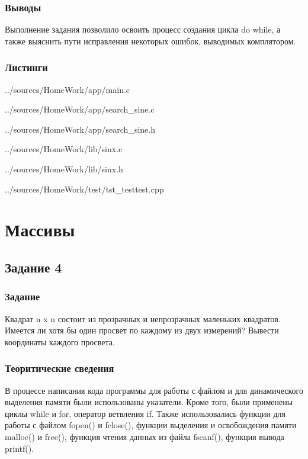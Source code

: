 \documentclass[12pt,a4paper]{report}
\begin{document}
\subsection{Выводы}
Выполнение задания позволило освоить процесс создания цикла do while, а также выяснить пути исправления некоторых ошибок, выводимых комплятором.

\subsection*{Листинги}

{../sources/HomeWork/app/main.c}


{../sources/HomeWork/app/search_sine.c}


{../sources/HomeWork/app/search_sine.h}


{../sources/HomeWork/lib/sinx.c}


{../sources/HomeWork/lib/sinx.h}


{../sources/HomeWork/test/tst_testtest.cpp}




\chapter{Массивы}
\section{Задание 4}
\subsection{Задание}
Квадрат n x n состоит из прозрачных и непрозрачных маленьких квадратов. Имеется ли хотя бы один просвет по каждому из двух измерений? Вывести координаты каждого просвета.

\subsection{Теоритические сведения}

В процессе написания кода программы для работы с файлом и для динамического выделения памяти были использованы указатели. Кроме того, были применены циклы while и for, оператор ветвления if. Также использовались функции для работы с файлом fopen() и fclose(), функции выделения и освобождения памяти malloc() и free(), функция чтения данных из файла fscanf(), функция вывода printf().
\end{document}
